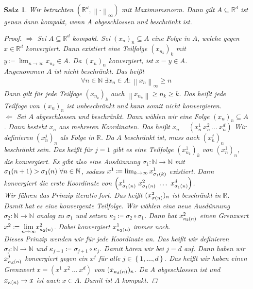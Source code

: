 \documentclass[11pt, twoside, a4paper]{article}
\theoremstyle{plain}
\newtheorem{satz}[blockelement]{Satz}
\numberwithin{equation}{subsection}
\newcommand{\set}[1]{\left\{#1\right\}}
\newcommand{\pair}[1]{\left(#1\right)}
\newcommand{\of}[1]{\mathopen{}\mathclose{}\bgroup\left(#1\aftergroup\egroup\right)}
\newcommand{\norm}[1]{\left\lVert#1\right\rVert}
\newcommand{\impl}[0]{\Rightarrow{}}
\newcommand{\fromto}{\rightarrow{}}
\newcommand{\ntoinf}[0]{n\fromto\infty}
\newcommand{\toinf}{\fromto\infty}
\newcommand{\ex}{\;\exists}
\newcommand{\biglim}[1]{{\displaystyle \lim_{#1}}}
\newcommand{\anf}[1]{\glqq{}#1\grqq}
\newcommand{\R}{\mathbb{R}}
\newcommand{\N}{\mathbb{N}}
\begin{document}
    \begin{satz}
        Wir betrachten $\pair{\R^d, \norm{\cdot}_{\infty}}$ mit Maximumsnorm. Dann gilt $A\subseteq \R^d$ ist genau dann kompakt, wenn $A$ abgeschlossen und beschränkt ist.
        \begin{proof}
            \anf{$\impl$} Sei $A\subseteq\R^d$ kompakt. Sei $(x_n)_n \subseteq A$ eine Folge in $A$, welche gegen $x\in\R^d$ konvergiert. Dann existiert eine Teilfolge $(x_{n_k})_k$ mit $y\coloneqq \lim_{\ntoinf} x_{n_k}\in A$. Da $(x_n)_n$ konvergiert, ist $x=y\in A$.\\
            Angenommen $A$ ist nicht beschränkt. Das heißt
            \begin{align*}
                \forall n\in\N\ex x_n\in A\colon \norm{x_n}_{\infty} \geq n
            \end{align*}
            Dann gilt für jede Teilfoge $(x_{n_k})_k$ auch $\norm{x_{n_k}} \geq n_k \geq k$. Das heißt jede Teilfoge von $(x_n)_n$ ist unbeschränkt und kann somit nicht konvergieren.\\[.5\baselineskip]
            \anf{$\Leftarrow$} Sei $A$ abgeschlossen und beschränkt. Dann wählen wir eine Folge $(x_n)_n\subseteq A$. Dann besteht $x_n$ aus mehreren Koordinaten. Das heißt $x_n = \pair{x_n^1~x_n^2~\dots~x_n^d}$ Wir definieren $(x_n^j)_n$ als Folge in $\R$. Da $A$ beschränkt ist, muss auch $(x_n^j)_n$ beschränkt sein. Das heißt für $j=1$ gibt es eine Teilfolge $(x_{n_k}^1)_k$ von $(x_n^1)_n$, die konvergiert. Es gibt also eine Ausdünnung $\sigma_1: \N\fromto\N$ mit $\sigma_1\of{n+1} > \sigma_1\of{n}~\forall n\in\N$, sodass $x^1\coloneqq \lim_{k\toinf} x_{\sigma_{1}\of{k}}^1$ existiert. Dann konvergiert die erste Koordinate von $\pair{x_{\sigma_1\of{n}}^1~x_{\sigma_1\of{n}}^2~\ldots~x_{\sigma_1\of{n}}^d}$.\\
            Wir führen das Prinzip iterativ fort. Das heißt $(x_{\sigma\of{n}}^2)_n$ ist beschränkt in $\R$. Damit hat es eine konvergente Teilfolge. Wir wählen eine neue Ausdünnung $\sigma_2: \N\fromto\N$ analog zu $\sigma_1$ und setzen $\kappa_2 \coloneqq \sigma_2 \circ \sigma_1$. Dann hat $x^2_{\kappa_2\of{n}}$ einen Grenzwert $x^2\coloneqq \biglim{\ntoinf} x^2_{\kappa_2\of{n}}$. Dabei konvergiert $x_{\kappa_2\of{n}}^1$ immer noch.\\
            Dieses Prinzip wenden wir für jede Koordinate an. Das heißt wir definieren $\sigma_j: \N\fromto\N$ und $\kappa_{j+1} \coloneqq \sigma_{j+1} \circ \kappa_j$. Damit hören wir bei $j=d$ auf. Dann haben wir $x_{\kappa_d\of{n}}^j$ konvergiert gegen ein $x^j$ für alle $j\in\set{1, \ldots, d}$. Das heißt wir haben einen Grenzwert $x=\pair{x^1~x^2~\dots~x^d}$ von $(x_{\kappa_d\of{n}})_n$. Da $A$ abgeschlossen ist und $x_{\kappa\of{n}} \fromto x$ ist auch $x\in A$. Damit ist $A$ kompakt.
        \end{proof}
    \end{satz}
\end{document}
